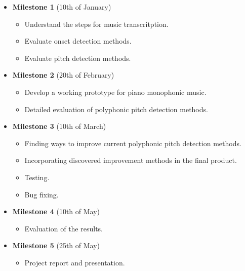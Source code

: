 \documentclass[11pt]{article} %
\begin{document}
\begin{itemize}
\item \textbf{Milestone 1} (10th of January)
	\begin{itemize}
	\item Understand the steps for music transcritption.
	\item Evaluate onset detection methods.
	\item Evaluate pitch detection methods.
	\end{itemize}
\end{itemize}

\begin{itemize}
\item \textbf{Milestone 2} (20th of February)
	\begin{itemize}
	\item Develop a working prototype for piano monophonic music.
	\item Detailed evaluation of polyphonic pitch detection methods.

	\end{itemize}
\end{itemize}

\begin{itemize}
\item \textbf{Milestone 3} (10th of March)
	\begin{itemize}
	\item Finding ways to improve current polyphonic pitch detection methods.
	\item Incorporating discovered improvement methods in the final product.
	\item Testing.
	\item Bug fixing.
	\end{itemize}
\end{itemize}

\begin{itemize}
\item \textbf{Milestone 4} (10th of May)
	\begin{itemize}
	\item Evaluation of the results.
	\end{itemize}
\end{itemize}

\begin{itemize}
\item \textbf{Milestone 5} (25th of May)
	\begin{itemize}
	\item Project report and presentation.
	\end{itemize}
\end{itemize}
\end{document}
